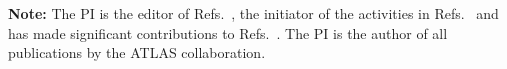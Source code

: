\documentclass[11pt,a4paper]{article}
\begin{document}



\clearpage




{\bf Note:} The PI is the editor of Refs.~\cite{Boveia:2018yeb,Abercrombie:2015wmb,Aaboud:2018fzt,Aaboud:2019zxd,Doglioni:2019fza}, the initiator of the activities in Refs.~\cite{DMWGWebsite,iDMEu} and has made significant contributions to Refs.~\cite{Strategy:2019vxc,Alves:2017she,Aaboud:2016leb,Aaboud:2019yqu}. The PI is the author of all publications by the ATLAS collaboration.
\end{document}

